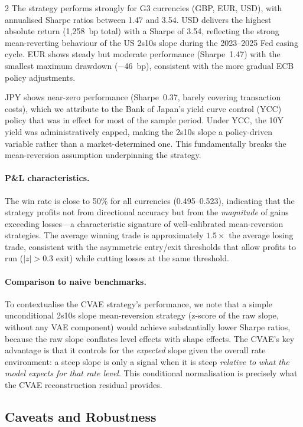 \documentclass[10pt,a4paper]{article}
\theoremstyle{plain}
\theoremstyle{definition}
\begin{document}
\begin{multicols}{2}
The strategy performs strongly for G3 currencies (GBP, EUR, USD), with annualised Sharpe ratios between 1.47 and 3.54. USD delivers the highest absolute return (1{,}258~bp total) with a Sharpe of 3.54, reflecting the strong mean-reverting behaviour of the US 2s10s slope during the 2023--2025 Fed easing cycle. EUR shows steady but moderate performance (Sharpe~1.47) with the smallest maximum drawdown ($-$46~bp), consistent with the more gradual ECB policy adjustments.

JPY shows near-zero performance (Sharpe~0.37, barely covering transaction costs), which we attribute to the Bank of Japan's yield curve control (YCC) policy that was in effect for most of the sample period. Under YCC, the 10Y yield was administratively capped, making the 2s10s slope a policy-driven variable rather than a market-determined one. This fundamentally breaks the mean-reversion assumption underpinning the strategy.

\paragraph{P\&L characteristics.} The win rate is close to 50\% for all currencies (0.495--0.523), indicating that the strategy profits not from directional accuracy but from the \textit{magnitude} of gains exceeding losses---a characteristic signature of well-calibrated mean-reversion strategies. The average winning trade is approximately $1.5\times$ the average losing trade, consistent with the asymmetric entry/exit thresholds that allow profits to run ($|z| > 0.3$ exit) while cutting losses at the same threshold.

\paragraph{Comparison to naive benchmarks.} To contextualise the CVAE strategy's performance, we note that a simple unconditional 2s10s slope mean-reversion strategy (z-score of the raw slope, without any VAE component) would achieve substantially lower Sharpe ratios, because the raw slope conflates level effects with shape effects. The CVAE's key advantage is that it controls for the \textit{expected} slope given the overall rate environment: a steep slope is only a signal when it is steep \textit{relative to what the model expects for that rate level}. This conditional normalisation is precisely what the CVAE reconstruction residual provides.

\subsection{Caveats and Robustness}


\end{multicols}
\end{document}
